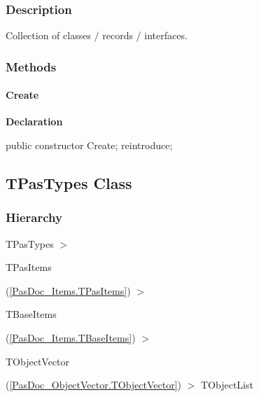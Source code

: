 \documentclass{report}
\newif\ifpdf
\begin{document}
\subsubsection*{\large{\textbf{Description}}\normalsize\hspace{1ex}\hfill}
Collection of classes / records / interfaces.\subsubsection*{\large{\textbf{Methods}}\normalsize\hspace{1ex}\hfill}
\paragraph*{Create}\hspace*{\fill}

\label{PasDoc_Items.TPasNestedCios-Create}
\begin{list}{}{
\setlength{\itemindent}{0cm}
\setlength{\listparindent}{0cm}
\setlength{\leftmargin}{\evensidemargin}
\addtolength{\leftmargin}{\tmplength}
\settowidth{\labelsep}{X}
\addtolength{\leftmargin}{\labelsep}
\setlength{\labelwidth}{\tmplength}
}
\item[\textbf{Declaration}\hfill]
\ifpdf
\begin{flushleft}
\fi
\begin{ttfamily}
public constructor Create; reintroduce;\end{ttfamily}

\ifpdf
\end{flushleft}
\fi

\end{list}
\ifpdf
\subsection*{\large{\textbf{TPasTypes Class}}\normalsize\hspace{1ex}\hrulefill}
\else
\subsection*{TPasTypes Class}
\fi
\label{PasDoc_Items.TPasTypes}
\subsubsection*{\large{\textbf{Hierarchy}}\normalsize\hspace{1ex}\hfill}
TPasTypes {$>$} \begin{ttfamily}TPasItems\end{ttfamily}(\ref{PasDoc_Items.TPasItems}) {$>$} \begin{ttfamily}TBaseItems\end{ttfamily}(\ref{PasDoc_Items.TBaseItems}) {$>$} \begin{ttfamily}TObjectVector\end{ttfamily}(\ref{PasDoc_ObjectVector.TObjectVector}) {$>$} 
TObjectList
\end{document}
